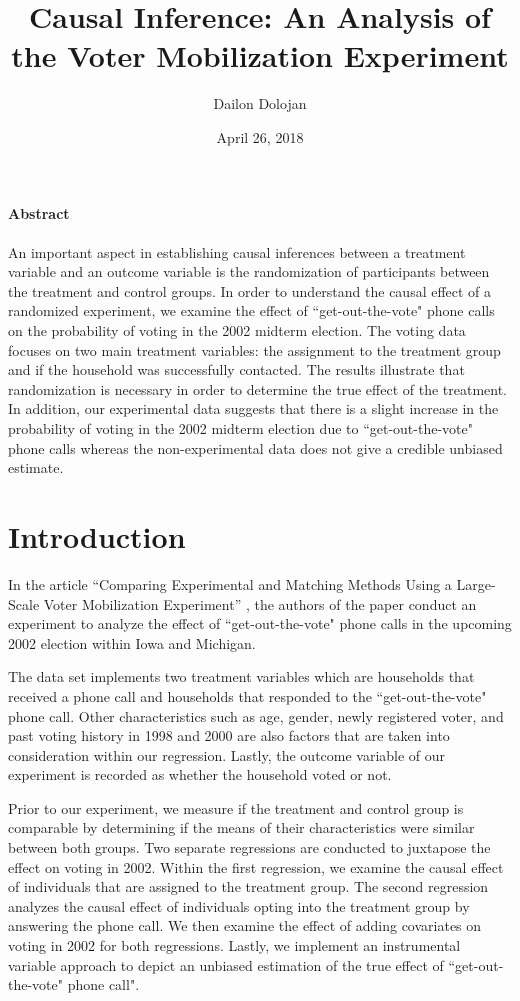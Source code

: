 \documentclass[12pt]{article}
\title{Causal Inference: An Analysis of the Voter Mobilization Experiment}
\author{Dailon Dolojan}
\date{April 26, 2018}
\begin{document}
\maketitle
\begin{center}
    \textbf{Abstract}
\end{center}
\paragraph{\indent}An important aspect in establishing causal inferences between a treatment variable and an outcome variable is the randomization of participants between the treatment and control groups. In order to understand the causal effect of a randomized experiment, we examine the effect of ``get-out-the-vote" phone calls on the probability of voting in the 2002 midterm election. The voting data focuses on two main treatment variables: the assignment to the treatment group and if the household was successfully contacted. The results illustrate that randomization is necessary in order to determine the true effect of the treatment. In addition, our experimental data suggests that there is a slight increase in the probability of voting in the 2002 midterm election due to ``get-out-the-vote" phone calls whereas the non-experimental data does not give a credible unbiased estimate. 

\section{Introduction}

\indent In the article ``Comparing Experimental and Matching Methods Using a Large-Scale Voter Mobilization Experiment” \cite{vote}, the authors of the paper conduct an experiment to analyze the effect of ``get-out-the-vote" phone calls in the upcoming 2002 election within Iowa and Michigan.

\indent The data set implements two treatment variables which are households that received a phone call and households that responded to the ``get-out-the-vote" phone call. Other characteristics such as age, gender, newly registered voter, and past voting history in 1998 and 2000 are also factors that are taken into consideration within our regression. Lastly, the outcome variable of our experiment is recorded as whether the household voted or not.

\indent Prior to our experiment, we measure if the treatment and control group is comparable by determining if the means of their characteristics were similar between both groups. Two separate regressions are conducted to juxtapose the effect on voting in 2002. Within the first regression, we examine the causal effect of individuals that are assigned to the treatment group. The second regression analyzes the causal effect of individuals opting into the treatment group by answering the phone call. We then examine the effect of adding covariates on voting in 2002 for both regressions. Lastly, we implement an instrumental variable approach to depict an unbiased estimation of the true effect of ``get-out-the-vote" phone call".
\end{document}
